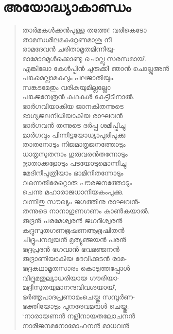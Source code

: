 \chapter{അയോദ്ധ്യാകാണ്ഡം}

\begin{verse}
താര്‍മകള്‍ക്കന്‍പുള്ള തത്തേ! വരികെടോ\\
താമസശീലമകറ്റേണമാശു നീ\\
രാമദേവന്‍ ചരിതാമൃതമിന്നിയു-\\
മാമോദമുള്‍ക്കൊണ്ടു ചൊല്ലൂ സരസമായ്.\\
എങ്കിലോ കേള്‍പ്പിന്‍ ചുരുക്കി ഞാന്‍ ചൊല്ലുഅന്‍\\
പങ്കമെല്ലാമകലും പലജാതിയും.\\
സങ്കടമേതും വരികയുമില്ലല്ലോ\\
പങ്കജനേത്രന്‍ കഥകള്‍ കേട്ടീടിനാല്‍.\\
ഭാര്‍ഗവിയാകിയ ജാനകിതന്നുടെ\\
ഭാഗ്യജലനിധിയാകിയ രാഘവന്‍\\
ഭാര്‍ഗവന്‍ തന്നുടെ ദര്‍പ്പ ശമിപ്പിച്ചു\\
മാര്‍ഗവും പിന്നിട്ടയോധ്യാപുരിപുക്കു\\
താതനോടും നിജമാതൃജനത്തോടും\\
ധാതൃസുതനാം ഗുരുവരന്‍തന്നോടും\\
ഭ്രാതാക്കളോടും പടയോടുമൊന്നിച്ചു\\
മേദിനീപുത്രിയാം ഭാമിനിതന്നോടും\\
വന്നെതിരേറ്റൊരു പൗരജനത്തോടും\\
ചെന്നു മഹാരാജധാനിയകംപുക്കു.\\
വന്നിതു സൗഖ്യം ജഗത്തിനു രാഘവന്‍-\\
തന്നുടെ നാനാഗുണഗണം കാണ്‍കയാല്‍.\\
രുദ്രന്‍ പരമേശ്വരന്‍ ജഗദീശ്വരന്‍\\
കദ്രുസുതഗണഭൂഷണആഭൂഷിതന്‍\\
ചിദ്രൂപനദ്വയന്‍ മൃത്യുഞ്ജയന്‍ പരന്‍\\
ഭദ്രപ്രദന്‍ ഭഗവാന്‍ ഭവഭഞ്ജനന്‍\\
രുദ്രാണിയാകിയ ദേവിക്കുടന്‍ രാമ-\\
ഭദ്രകഥാമൃതസാരം കൊടുത്തപ്പോള്‍\\
വിദ്രുമതുല്യാധരിയായ ഗൗരിയാ-\\
മദ്രിസുതയുമാനന്ദവിവശയായ്,\\
ഭര്‍ത്തൃപാദപ്രണാമംചെയ്തു സമ്പൂര്‍ണ-\\
ഭക്തിയോടും പുനരേവമരുള്‍ ചെയ്തു:\\
‘നാരായണന്‍ നളിനായതലോചനന്‍\\
നാരീജനമനോമോഹനന്‍ മാധവന്‍\\

\end{verse}
